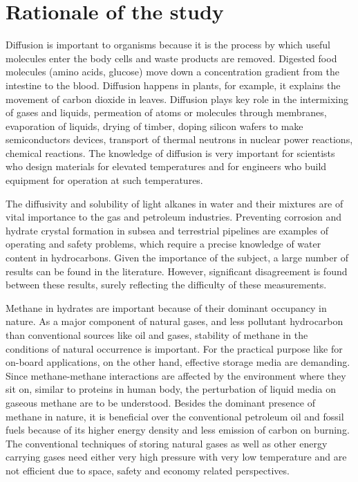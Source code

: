 \section{Rationale of the study}

Diffusion is important to organisms because it is the process by which useful molecules enter the body cells and waste products are removed. Digested food molecules (amino acids, glucose) move down a concentration gradient from the intestine to the blood. Diffusion happens in  plants, for example, it explains the movement of carbon dioxide in leaves. Diffusion plays key role in the intermixing of gases and liquids, permeation of atoms or molecules through membranes,
evaporation of liquids, drying of timber, doping silicon wafers to make semiconductors
devices, transport of thermal neutrons in nuclear power reactions, chemical reactions.
The knowledge of diffusion is very important for scientists who design materials for
elevated temperatures and for engineers who build equipment for operation at such
temperatures.

The diffusivity and  solubility of light alkanes in water and their mixtures are of vital importance to the gas and petroleum industries. Preventing corrosion and hydrate crystal formation in subsea and terrestrial pipelines are examples of operating and safety problems, which require a precise knowledge of water content in hydrocarbons. Given the importance of the subject, a large number of results can be found in the literature. However, significant disagreement is found between these results, surely reflecting the difficulty of these measurements.


Methane in hydrates are important because of their dominant occupancy in nature. As a major component of natural gases, and less pollutant hydrocarbon than conventional sources like oil and gases, stability of methane in the conditions of natural occurrence is important. For the practical purpose
like for on-board applications, on the other hand, effective storage media are demanding. Since methane-methane interactions are affected by the environment where they sit on, similar to proteins in human body, the perturbation of liquid media on gaseous methane  are to be understood. Besides the dominant presence of methane in nature, it is beneficial over the conventional petroleum oil and fossil fuels because of its higher energy density and less emission of carbon on burning. The conventional techniques of storing natural gases as well as other energy carrying gases need either very high pressure with very low temperature and are not efficient due to space, safety and economy related perspectives. 



